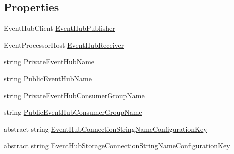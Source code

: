 \subsection*{Properties}
\begin{DoxyCompactItemize}
\item 
Event\+Hub\+Client \hyperlink{classCqrs_1_1Azure_1_1ServiceBus_1_1AzureEventHub_a5f64ce36efaee0f676816c803620d05e_a5f64ce36efaee0f676816c803620d05e}{Event\+Hub\+Publisher}
\item 
Event\+Processor\+Host \hyperlink{classCqrs_1_1Azure_1_1ServiceBus_1_1AzureEventHub_a1b12b47dbb9b9afe2014477a2e457c35_a1b12b47dbb9b9afe2014477a2e457c35}{Event\+Hub\+Receiver}
\item 
string \hyperlink{classCqrs_1_1Azure_1_1ServiceBus_1_1AzureEventHub_ac6802047e00a92ea4b0ae6b69ef7310a_ac6802047e00a92ea4b0ae6b69ef7310a}{Private\+Event\+Hub\+Name}
\item 
string \hyperlink{classCqrs_1_1Azure_1_1ServiceBus_1_1AzureEventHub_a6012f2290f9397929e9d6d5419963482_a6012f2290f9397929e9d6d5419963482}{Public\+Event\+Hub\+Name}
\item 
string \hyperlink{classCqrs_1_1Azure_1_1ServiceBus_1_1AzureEventHub_a0c091d0cb19dda3e8bfc20f0e7d30af3_a0c091d0cb19dda3e8bfc20f0e7d30af3}{Private\+Event\+Hub\+Consumer\+Group\+Name}
\item 
string \hyperlink{classCqrs_1_1Azure_1_1ServiceBus_1_1AzureEventHub_a505c495eb73e4f888431d408e0b0d8ab_a505c495eb73e4f888431d408e0b0d8ab}{Public\+Event\+Hub\+Consumer\+Group\+Name}
\item 
abstract string \hyperlink{classCqrs_1_1Azure_1_1ServiceBus_1_1AzureEventHub_ad77526406b246313591e11b90e1a67d5_ad77526406b246313591e11b90e1a67d5}{Event\+Hub\+Connection\+String\+Name\+Configuration\+Key}
\item 
abstract string \hyperlink{classCqrs_1_1Azure_1_1ServiceBus_1_1AzureEventHub_ad400a17bf61c218e6330cd6500458801_ad400a17bf61c218e6330cd6500458801}{Event\+Hub\+Storage\+Connection\+String\+Name\+Configuration\+Key}

\end{DoxyCompactItemize}
